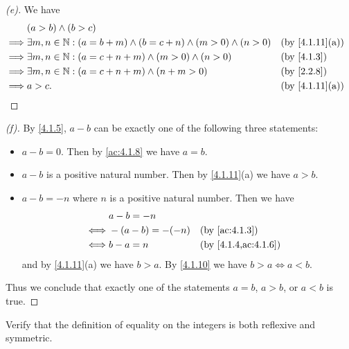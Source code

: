\begin{proof}[(e)]
  We have
  \begin{align*}
             & (a > b) \land (b > c)                                                                                             \\
    \implies & \exists m, n \in \N : (a = b + m) \land (b = c + n) \land (m > 0) \land (n > 0) &  & \text{(by \cref{4.1.11}(a))} \\
    \implies & \exists m, n \in \N : (a = c + n + m) \land (m > 0) \land (n > 0)               &  & \by{4.1.3}                   \\
    \implies & \exists m, n \in \N : (a = c + n + m) \land (n + m > 0)                         &  & \by{2.2.8}                   \\
    \implies & a > c.                                                                          &  & \text{(by \cref{4.1.11}(a))}
  \end{align*}
\end{proof}

\begin{proof}[(f)]
  By \cref{4.1.5}, \(a - b\) can be exactly one of the following three statements:
  \begin{itemize}
    \item \(a - b = 0\).
          Then by \cref{ac:4.1.8} we have \(a = b\).
    \item \(a - b\) is a positive natural number.
          Then by \cref{4.1.11}(a) we have \(a > b\).
    \item \(a - b = -n\) where \(n\) is a positive natural number.
          Then we have
          \begin{align*}
                 & a - b = -n                                \\
            \iff & -(a - b) = -(-n) &  & \by{ac:4.1.3}       \\
            \iff & b - a = n        &  & \by{4.1.4,ac:4.1.6}
          \end{align*}
          and by \cref{4.1.11}(a) we have \(b > a\).
          By \cref{4.1.10} we have \(b > a \iff a < b\).
  \end{itemize}
  Thus we conclude that exactly one of the statements \(a = b\), \(a > b\), or \(a < b\) is true.
\end{proof}

\exercisesection

\begin{ex}\label{ex:4.1.1}
  Verify that the definition of equality on the integers is both reflexive and symmetric.
\end{ex}

